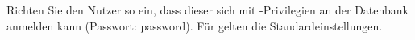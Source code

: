     \item Richten Sie den Nutzer  so ein, dass dieser sich mit -Privilegien an der Datenbank anmelden kann (Passwort: password). F\"ur  gelten die Standard\-einstellungen.
